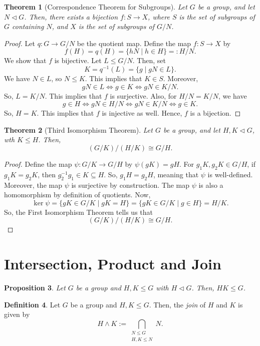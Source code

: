 \documentclass[a4paper, openany]{memoir}
\theoremstyle{definition}
\newtheorem{definition}{Definition}[section]
\theoremstyle{plain}
\newtheorem{theorem}[definition]{Theorem}
\newtheorem{proposition}[definition]{Proposition}
\begin{document}
    \begin{theorem}[Correspondence Theorem for Subgroups]
        Let $G$ be a group, and let $N \vartriangleleft G$. Then, there exists a bijection $f: S \to X$, where $S$ is the set of subgroups of $G$ containing $N$, and $X$ is the set of subgroups of $G/N$.
    \end{theorem}
    \begin{proof}
        Let $q: G \to G/N$ be the quotient map. Define the map $f: S \to X$ by 
        \[f(H) = q(H) = \{hN \mid h \in H\} =: H/N.\]
        We show that $f$ is bijective. Let $L \leq G/N$. Then, set 
        \[K = q^{-1}(L) = \{g \mid gN \in L\}.\]
        We have $N \in L$, so $N \leq K$. This implies that $K \in S$. Moreover,
        \[gN \in L \iff g \in K \iff gN \in K/N.\]
        So, $L = K/N$. This implies that $f$ is surjective. Also, for $H/N = K/N$, we have
        \[g \in H \iff gN \in H/N \iff gN \in K/N \iff g \in K.\]
        So, $H = K$. This implies that $f$ is injective as well. Hence, $f$ is a bijection.
    \end{proof}

    \begin{theorem}[Third Isomorphism Theorem]
        Let $G$ be a group, and let $H, K \vartriangleleft G$, wth $K \leq H$. Then,
        \[(G/K)/(H/K) \cong G/H.\]
    \end{theorem}
    \begin{proof}
        Define the map $\psi: G/K \to G/H$ by $\psi(gK) = gH$. For $g_1K, g_2K \in G/H$, if $g_1K = g_2K$, then $g_2^{-1}g_1 \in K \subseteq H$. So, $g_1H = g_2H$, meaning that $\psi$ is well-defined. Moreover, the map $\psi$ is surjective by construction. The map $\psi$ is also a homomorphism by definition of quotients. Now,
        \[\ker \psi = \{gK \in G/K \mid gK = H\} = \{gK \in G/K \mid g \in H\} = H/K.\]
        So, the First Isomorphism Theorem tells us that
        \[(G/K)/(H/K) \cong G/H.\]
    \end{proof}

    \newpage

    \section{Intersection, Product and Join}
    \begin{proposition}
        Let $G$ be a group and $H, K \leq G$ with $H \vartriangleleft G$. Then, $HK \leq G$.
    \end{proposition}

    \begin{definition}
        Let $G$ be a group and $H, K \leq G$. Then, the \emph{join} of $H$ and $K$ is given by
        \[H \wedge K := \bigcap_{\substack{N \leq G \\ H, K \leq N}} N.\]
    \end{definition}
\end{document}
